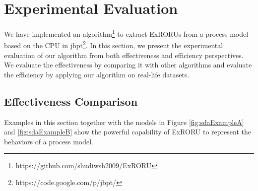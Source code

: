 \documentclass[dvips,...]{llncs}
\begin{document}

\section{Experimental Evaluation}\label{sec:experiments}
We have implemented an algorithm\footnote{https://github.com/shudiwsh2009/ExRORU} to extract ExRORUs from a process model based on the CPU in jbpt\footnote{https://code.google.com/p/jbpt/}. In this section, we present the experimental evaluation of our algorithm from both effectiveness and efficiency perspectives. We evaluate the effectiveness by comparing it with other algorithms and evaluate the efficiency by applying our algorithm on real-life datasets.

\subsection{Effectiveness Comparison}\label{subsec:effectiveness}
Examples in this section together with the models in Figure \ref{fig:sdaExampleA} and \ref{fig:sdaExampleB} show the powerful capability of ExRORU to represent the behaviors of a process model.
\end{document}
